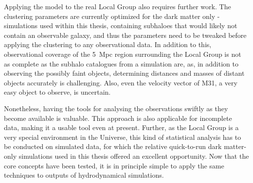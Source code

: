 \documentclass[english, twoside]{HYgradu}
\begin{document}
Applying the model to the real Local Group also requires further work. The clustering parameters are currently optimized for the dark matter only -simulations used within this thesis, containing subhaloes that would likely not contain an observable galaxy, and thus the parameters need to be tweaked before applying the clustering to any observational data. In addition to this, observational coverage of the 5~Mpc region surrounding the Local Group is not as complete as the subhalo catalogues from a simulation are, as, in addition to observing the possibly faint objects, determining distances and masses of distant objects accurately is challenging. Also, even the velocity vector of M31, a very easy object to observe, is uncertain.

Nonetheless, having the tools for analysing the observations swiftly as they become available is valuable. This approach is also applicable for incomplete data, making it a usable tool even at present. Further, as the Local Group is a very special environment in the Universe, this kind of statistical analysis has to be conducted on simulated data, for which the relative quick-to-run dark matter-only simulations used in this thesis offered an excellent opportunity. Now that the core concepts have been tested, it is in principle simple to apply the same techniques to outputs of hydrodynamical simulations.





\clearpage
{} %



\newpage
\appendix
\end{document}
